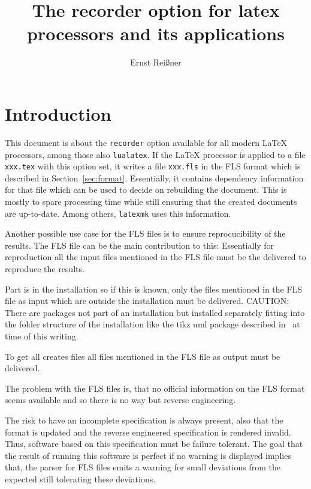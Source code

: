 \documentclass[a4paper]{article}
\title{The recorder option for latex processors and its applications}
\author{Ernst Reißner}
\date{}
\begin{document}
\maketitle
\tableofcontents

\section{Introduction}\label{sec:intro}

This document is about the \texttt{recorder} option available for all modern \LaTeX{} processors, 
among those also \texttt{lualatex}. 
If the \LaTeX{} processor is applied to a file \texttt{xxx.tex} with this option set, 
it writes a file \texttt{xxx.fls} in the FLS format 
which is described in Section~\ref{sec:format}. 
Essentially, it contains dependency information for that file 
which can be used to decide on rebuilding the document. 
This is mostly to spare processing time 
while still ensuring that the created documents are up-to-date. 
Among others, \texttt{latexmk} uses this information. 

Another possible use case for the FLS files is to ensure reprocucibility of the results. 
The FLS file can be the main contribution to this: 
Essentially for reproduction all the input files mentioned in the FLS file 
must be the delivered to reproduce the results. 

Part is in the installation so if this is known, 
only the files mentioned in the FLS file as input which are outside the installation must be delivered. 
CAUTION\@: There are packages not part of an installation 
but installed separately fitting into the folder structure of the installation 
like the tikz uml package described in~\cite{tikzumlP} at time of this writing. 

To get all creates files all files mentioned in the FLS file as output must be delivered. 
\medskip


The problem with the FLS files is, 
that no official information on the FLS format seems available 
and so there is no way but reverse engineering. 

The risk to have an incomplete specification is always present, 
also that the format is updated and the reverse engineered specification is rendered invalid. 
Thus, software based on this specification must be failure tolerant. 
The goal that the result of running this software is perfect if no warning is displayed 
implies that, the parser for FLS files emits a warning for small deviations from the expected 
still tolerating these deviations. 
\end{document}
